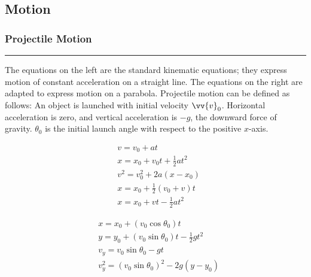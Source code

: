 \documentclass{article}
\begin{document}
    \tableofcontents
    \pagebreak

    \begin{center}
        \subsection*{Motion}
    \end{center}

    \medskip
    \subsubsection*{Projectile Motion}
    \vspace{-1em}
    \rule{\linewidth}{.1mm}

    \smallskip\noindent
    The equations on the left are the standard kinematic equations; they express motion of constant acceleration on a straight line.
    The equations on the right are adapted to express motion on a parabola.
    Projectile motion can be defined as follows:
    An object is launched with initial velocity $\vv{v}_{0}$.
    Horizontal acceleration is zero, and vertical acceleration is $-g$, the downward force of gravity.
    $\theta_0$ is the initial launch angle with respect to the positive $x$-axis.

    \vspace{-1.4em}
    \begin{minipage}[t]{0.4\linewidth}
        \begin{align*}
            &v=v_0+at \\
            &x=x_0+v_0 t+\tfrac{1}{2}at^2 \\
            &v^2=v_0^2+2a\left(x-x_0\right) \\
            &x=x_0+\tfrac{1}{2}\left(v_0+v\right)t \\
            &x=x_0+v t-\tfrac{1}{2}at^2
        \end{align*}
    \end{minipage}
    \begin{minipage}[t]{0.5\linewidth}
        \begin{align*}
            &x=x_0+\left(v_0\cos\theta_0\right)t \\
            &y=y_0+\left(v_0\sin\theta_0\right)t-\tfrac{1}{2}gt^2 \\
            &v_y=v_0\sin\theta_0-gt \\
            &v_y^2=\left(v_0\sin\theta_0\right)^2-2g\left(y-y_0\right)
        \end{align*}
    \end{minipage}
\end{document}
